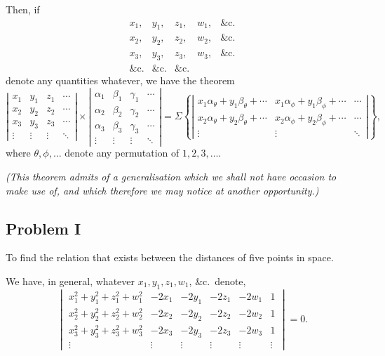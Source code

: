 \documentclass[11pt,a4paper]{book}
\begin{document}
Then, if
\[
\begin{array}{ccccc}
x_1, & y_1, & z_1, & w_1, & \&\mathrm{c.} \\
x_2, & y_2, & z_2, & w_2, & \&\mathrm{c.} \\
x_3, & y_3, & z_3, & w_3, & \&\mathrm{c.} \\
\&\mathrm{c.} & \&\mathrm{c.} & \&\mathrm{c.}
\end{array}
\]
denote any quantities whatever, we have the theorem
\[
\left|\begin{array}{cccc}
x_1 & y_1 & z_1 & \cdots \\
x_2 & y_2 & z_2 & \cdots \\
x_3 & y_3 & z_3 & \cdots \\
\vdots & \vdots & \vdots & \ddots
\end{array}\right|
\times
\left|\begin{array}{cccc}
\alpha_1 & \beta_1 & \gamma_1 & \cdots \\
\alpha_2 & \beta_2 & \gamma_2 & \cdots \\
\alpha_3 & \beta_3 & \gamma_3 & \cdots \\
\vdots & \vdots & \vdots & \ddots
\end{array}\right|
= \Sigma \left\{
\left|\begin{array}{cccc}
x_1\alpha_{\theta} + y_1\beta_{\theta} + \cdots &
x_1\alpha_{\phi} + y_1\beta_{\phi} + \cdots & \cdots \\
x_2\alpha_{\theta} + y_2\beta_{\theta} + \cdots &
x_2\alpha_{\phi} + y_2\beta_{\phi} + \cdots & \cdots \\
\vdots & \vdots & \ddots
\end{array}\right|
\right\},
\]
where $\theta, \phi, \ldots$ denote any permutation of $1, 2, 3, \ldots$.

\textit{(This theorem admits of a generalisation which we shall not have occasion to make use of, and which therefore we may notice at another opportunity.)}

\subsection*{Problem I}

To find the relation that exists between the distances of five points in space.

We have, in general, whatever $x_1, y_1, z_1, w_1$, \&c.\ denote,
\[
\begin{vmatrix}
x_1^2 + y_1^2 + z_1^2 + w_1^2 & -2x_1 & -2y_1 & -2z_1 & -2w_1 & 1 \\
x_2^2 + y_2^2 + z_2^2 + w_2^2 & -2x_2 & -2y_2 & -2z_2 & -2w_2 & 1 \\
x_3^2 + y_3^2 + z_3^2 + w_3^2 & -2x_3 & -2y_3 & -2z_3 & -2w_3 & 1 \\
\vdots & \vdots & \vdots & \vdots & \vdots & \vdots
\end{vmatrix} = 0.
\]
\end{document}
